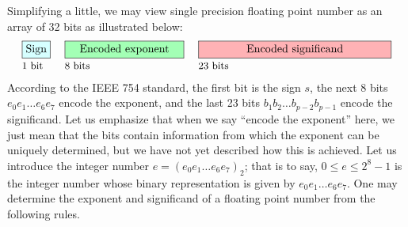 Simplifying a little,
we may view single precision floating point number as an array of 32 bits as illustrated below:
\begin{alignat*}{3}
    &\fcolorbox{black}{lightcyan}{\text{Sign}}
    \hspace{.1cm}
    &&\fcolorbox{black}{lightgreen}{\quad\text{Encoded exponent}\quad}
    \hspace{.1cm}
    &&\fcolorbox{black}{lightred}{\qquad\qquad\text{Encoded significand}\qquad\qquad}\\[-.1cm]
    &\text{\small 1 bit} &&\text{\small 8 bits} &&\text{\small 23 bits}
\end{alignat*}
According to the IEEE 754 standard,
the first bit is the sign $s$,
the next 8 bits $e_0 e_1 \dots e_6 e_7$ encode the exponent,
and the last 23 bits $b_1 b_2 \dots b_{p-2} b_{p-1}$ encode the significand.
Let us emphasize that when we say ``encode the exponent'' here,
we just mean that the bits contain information from which the exponent can be uniquely determined,
but we have not yet described how this is achieved.
Let us introduce the integer number $e = (e_0 e_1 \dots e_6 e_7)_2$;
that is to say, $0 \leq e \leq 2^8 -1$ is the integer number whose binary representation
is given by $e_0 e_1 \dots e_6 e_7$.
One may determine the exponent and significand of a floating point number from the following rules.
